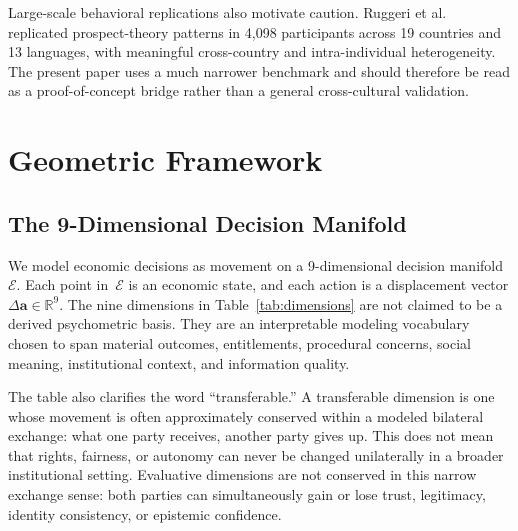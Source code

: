 \documentclass[journal]{IEEEtran}
\newcommand{\E}{\mathcal{E}}               %
\begin{document}
Large-scale behavioral replications also motivate caution.
Ruggeri et al.~\cite{ruggeri2020} replicated prospect-theory patterns in 4,098 participants across 19 countries and 13 languages, with meaningful cross-country and intra-individual heterogeneity.
The present paper uses a much narrower benchmark and should therefore be read as a proof-of-concept bridge rather than a general cross-cultural validation.
\section{Geometric Framework}
\label{sec:framework}

\subsection{The 9-Dimensional Decision Manifold}

We model economic decisions as movement on a 9-dimensional decision manifold~$\E$.
Each point in~$\E$ is an economic state, and each action is a displacement vector $\Delta \mathbf{a} \in \mathbb{R}^9$.
The nine dimensions in Table~\ref{tab:dimensions} are not claimed to be a derived psychometric basis.
They are an interpretable modeling vocabulary chosen to span material outcomes, entitlements, procedural concerns, social meaning, institutional context, and information quality.

The table also clarifies the word ``transferable.''
A transferable dimension is one whose movement is often approximately conserved within a modeled bilateral exchange: what one party receives, another party gives up.
This does not mean that rights, fairness, or autonomy can never be changed unilaterally in a broader institutional setting.
Evaluative dimensions are not conserved in this narrow exchange sense: both parties can simultaneously gain or lose trust, legitimacy, identity consistency, or epistemic confidence.
\end{document}
